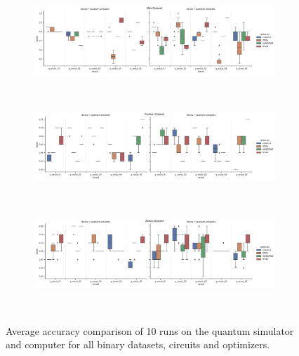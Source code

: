 \begin{figure}[!ht]
\begin{subfigure}{1.0\textwidth}
        \centering
        \includegraphics[width=1.0\linewidth]{thesis/Figures/qnn/boxplots/100_vlds.png} 
        \label{subfigure:accuracy_comparison_boxplots_vlds_binary_dataset}
    \end{subfigure}
    \\[-3ex]
    \begin{subfigure}{1.0\textwidth}
        \centering
        \includegraphics[width=1.0\linewidth]{thesis/Figures/qnn/boxplots/100_custom.png}
        \label{subfigure:accuracy_comparison_boxplots_custom_binary_dataset}
    \end{subfigure}
    \\[-3ex]
    \begin{subfigure}{1.0\textwidth}
        \centering
        \includegraphics[width=1.0\linewidth]{thesis/Figures/qnn/boxplots/100_adhoc.png}
        \label{subfigure:accuracy_comparison_boxplots_adhoc_binary_dataset}
    \end{subfigure}
    \\[-3ex]
    \caption{Average accuracy comparison of 10 runs on the quantum simulator and computer for all binary datasets, circuits and optimizers.}
    \label{figure:accuracy_comparison_boxplots_binary_datasets}
\end{figure}

